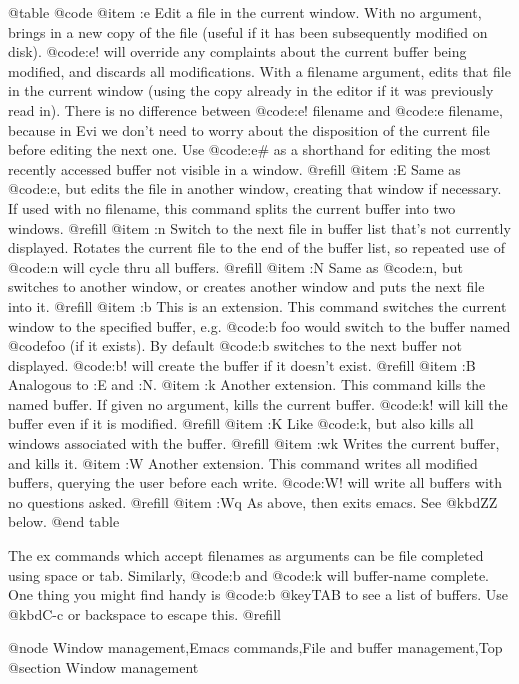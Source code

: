 @table @code
@item :e
Edit a file in the current window.  With no argument, brings
in a new copy of the file (useful if it has been subsequently
modified on disk).  @code{:e!} will override any complaints about
the current buffer being modified, and discards all
modifications.  With a filename argument, edits that file
in the current window (using the copy already in the editor
if it was previously read in).  There is no difference
between @code{:e! filename} and @code{:e filename}, because in Evi we
don't need to worry about the disposition of the current
file before editing the next one.  Use @code{:e#} as a shorthand for
editing the most recently accessed buffer not visible in a window. @refill
@item :E
Same as @code{:e}, but edits the file in another window, creating
that window if necessary.  If used with no filename, this command splits the
current buffer into two windows. @refill
@item :n
Switch to the next file in buffer list that's not currently
displayed.  Rotates the current file to the end of the buffer
list, so repeated use of @code{:n} will cycle thru all buffers. @refill
@item :N
Same as @code{:n}, but switches to another window, or creates another
window and puts the next file into it. @refill
@item :b
This is an extension.  This command switches the current
window to the specified buffer, e.g. @code{:b foo} would switch
to the buffer named @code{foo} (if it exists).  By default @code{:b}
switches to the next buffer not displayed.  @code{:b!} will create
the buffer if it doesn't exist. @refill
@item :B
Analogous to :E and :N.
@item :k
Another extension.  This command kills the named buffer.  If given
no argument, kills the current buffer.  @code{:k!} will kill the buffer
even if it is modified. @refill
@item :K
Like @code{:k}, but also kills all windows associated with the buffer. @refill
@item :wk
Writes the current buffer, and kills it.
@item :W
Another extension.  This command writes all modified buffers, querying
the user before each write.  @code{:W!} will
write all buffers with no questions asked. @refill
@item :Wq
As above, then exits emacs.  See @kbd{ZZ} below.
@end table

The ex commands which accept filenames as arguments can be file
completed using space or tab.  Similarly,
@code{:b} and @code{:k} will buffer-name complete.
One thing you might find handy is
@code{:b @key{TAB}} to see a list of buffers.
Use @kbd{C-c} or backspace to escape this. @refill

@node Window management,Emacs commands,File and buffer management,Top
@section Window management

